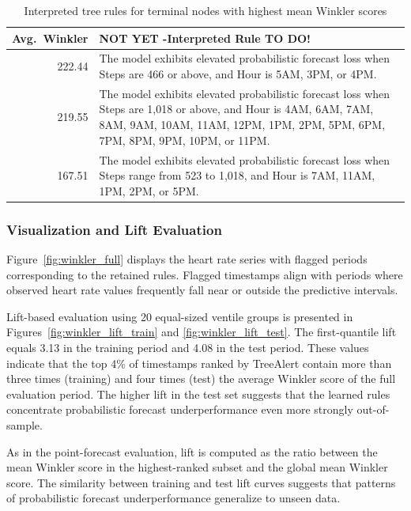 \documentclass[preprint,12pt]{elsarticle}
\begin{document}
\begin{table}[H]
\centering
\caption{Interpreted tree rules for terminal nodes with highest mean Winkler scores}
\label{tab:winkler_rules}
\small
\begin{tabular}{r p{12.5cm}}
\hline
\textbf{Avg.~Winkler} & \textbf{NOT YET -Interpreted Rule TO DO!} \\
\hline
222.44 & The model exhibits elevated probabilistic forecast loss when Steps are 466 or above, and Hour is 5AM, 3PM, or 4PM. \\
219.55 & The model exhibits elevated probabilistic forecast loss when Steps are 1,018 or above, and Hour is 4AM, 6AM, 7AM, 8AM, 9AM, 10AM, 11AM, 12PM, 1PM, 2PM, 5PM, 6PM, 7PM, 8PM, 9PM, 10PM, or 11PM. \\
167.51 & The model exhibits elevated probabilistic forecast loss when Steps range from 523 to 1,018, and Hour is 7AM, 11AM, 1PM, 2PM, or 5PM. \\
\hline
\end{tabular}
\end{table}

\subsubsection*{Visualization and Lift Evaluation}

Figure~\ref{fig:winkler_full} displays the heart rate series with flagged periods corresponding to the retained rules. Flagged timestamps align with periods where observed heart rate values frequently fall near or outside the predictive intervals.

Lift-based evaluation using 20 equal-sized ventile groups is presented in Figures~\ref{fig:winkler_lift_train} and \ref{fig:winkler_lift_test}. The first-quantile lift equals 3.13 in the training period and 4.08 in the test period. These values indicate that the top 4\% of timestamps ranked by TreeAlert contain more than three times (training) and four times (test) the average Winkler score of the full evaluation period. The higher lift in the test set suggests that the learned rules concentrate probabilistic forecast underperformance even more strongly out-of-sample.

As in the point-forecast evaluation, lift is computed as the ratio between the mean Winkler score in the highest-ranked subset and the global mean Winkler score. The similarity between training and test lift curves suggests that patterns of probabilistic forecast underperformance generalize to unseen data.
\end{document}
